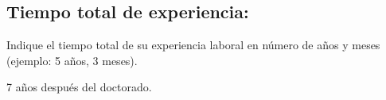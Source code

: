 \subsection{Tiempo total de experiencia:}
\begin{instrucciones}
  Indique el tiempo total de su experiencia laboral en número de años
  y meses (ejemplo: 5 años, 3 meses).
\end{instrucciones}
7 años después del doctorado.

